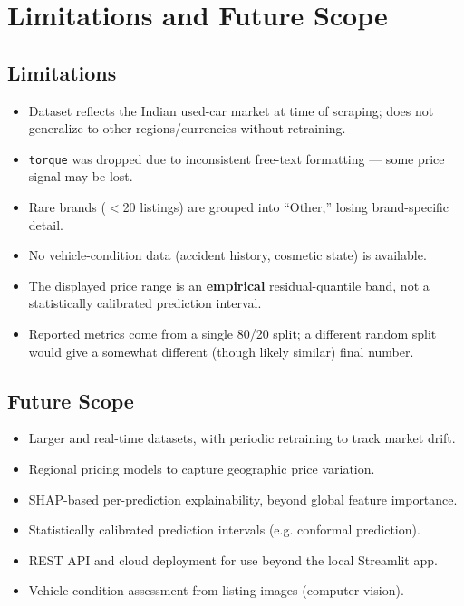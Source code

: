 \documentclass[12pt,a4paper]{report}
\begin{document}
\chapter{Limitations and Future Scope}

\section*{Limitations}
\begin{itemize}[nosep]
    \item Dataset reflects the Indian used-car market at time of scraping; does not generalize to other regions/currencies without retraining.
    \item \texttt{torque} was dropped due to inconsistent free-text formatting --- some price signal may be lost.
    \item Rare brands ($<$20 listings) are grouped into ``Other,'' losing brand-specific detail.
    \item No vehicle-condition data (accident history, cosmetic state) is available.
    \item The displayed price range is an \textbf{empirical} residual-quantile band, not a statistically calibrated prediction interval.
    \item Reported metrics come from a single 80/20 split; a different random split would give a somewhat different (though likely similar) final number.
\end{itemize}

\section*{Future Scope}
\begin{itemize}[nosep]
    \item Larger and real-time datasets, with periodic retraining to track market drift.
    \item Regional pricing models to capture geographic price variation.
    \item SHAP-based per-prediction explainability, beyond global feature importance.
    \item Statistically calibrated prediction intervals (e.g. conformal prediction).
    \item REST API and cloud deployment for use beyond the local Streamlit app.
    \item Vehicle-condition assessment from listing images (computer vision).
\end{itemize}
\end{document}
